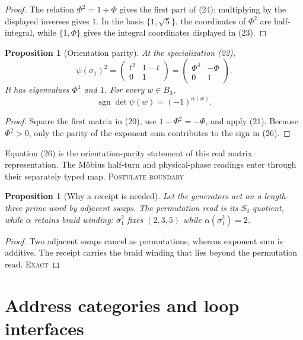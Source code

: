 \documentclass[10pt]{article}
\newtheorem{proposition}[definition]{Proposition}
\theoremstyle{remark}
\newcommand{\sgn}{\operatorname{sgn}}
\newcommand{\cstatus}[1]{\hfill\textsc{#1}}
\newcommand{\exact}{\textsc{Exact}}
\begin{document}
\begin{proof}
The relation $\Phi^2=1+\Phi$ gives the first part of (24); multiplying by
the displayed inverses gives $1$.  In the basis $\{1,\sqrt5\}$, the
coordinates of $\Phi^2$ are half-integral, while $\{1,\Phi\}$ gives the
integral coordinates displayed in (23).
\end{proof}

\begin{proposition}[Orientation parity]\label{prop:parity}
At the specialization (22),
\[
 \psi(\sigma_1)^2=
 \begin{pmatrix}t^2&1-t\\0&1\end{pmatrix}
=\begin{pmatrix}\Phi^4&-\Phi\\0&1\end{pmatrix}.
\tag{25}
\]
It has eigenvalues $\Phi^4$ and $1$.  For every $w\in B_3$,
\[
 \sgn\det\psi(w)=(-1)^{\alpha(w)}.
\tag{26}
\]
\end{proposition}

\begin{proof}
Square the first matrix in (20), use $1-\Phi^2=-\Phi$, and apply (21).
Because $\Phi^2>0$, only the parity of the exponent sum contributes to the
sign in (26).
\end{proof}

Equation (26) is the orientation-parity statement of this real matrix
representation.  The M\"obius half-turn and physical-phase readings enter
through their separately typed map. \cstatus{Postulate boundary}

\begin{proposition}[Why a receipt is needed]\label{prop:receipt}
Let the generators act on a length-three prime word by adjacent swaps.  The
permutation read is its $S_3$ quotient, while $\alpha$ retains braid winding:
$\sigma_1^2$ fixes $(2,3,5)$ while
$\alpha(\sigma_1^2)=2$.
\end{proposition}

\begin{proof}
Two adjacent swaps cancel as permutations, whereas exponent sum is additive.
The receipt carries the braid winding that lies beyond the permutation read.
\cstatus{\exact}
\end{proof}

\section{Address categories and loop interfaces}
\end{document}

